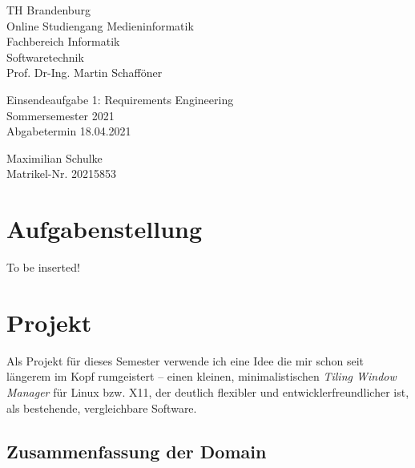 \documentclass{article}
\begin{document}
\begin{titlepage}
	\begin{flushleft}
		TH Brandenburg \\
		Online Studiengang Medieninformatik \\
		Fachbereich Informatik \\
		Softwaretechnik \\
		Prof. Dr-Ing. Martin Schafföner
	\end{flushleft}

	\vfill

	\begin{center}
		\Large{Einsendeaufgabe 1: Requirements Engineering}\\[0.5em]
		\large{Sommersemester 2021}\\[0.25em]
		\large{Abgabetermin 18.04.2021}
	\end{center}

	\vfill

	\begin{flushright}
		Maximilian Schulke \\
		Matrikel-Nr. 20215853
	\end{flushright}
\end{titlepage}

\tableofcontents

\newpage

\section{Aufgabenstellung}


\vspace{100px}
\begin{center}
	\large{To be inserted!}
\end{center}
\vspace{100px}

\section{Projekt}

Als Projekt für dieses Semester verwende ich eine Idee die mir schon seit längerem im Kopf rumgeistert
– einen kleinen, minimalistischen \emph{Tiling Window Manager} für Linux bzw. X11, der deutlich flexibler
und entwicklerfreundlicher ist, als bestehende, vergleichbare Software.

\subsection{Zusammenfassung der Domain}
\end{document}
